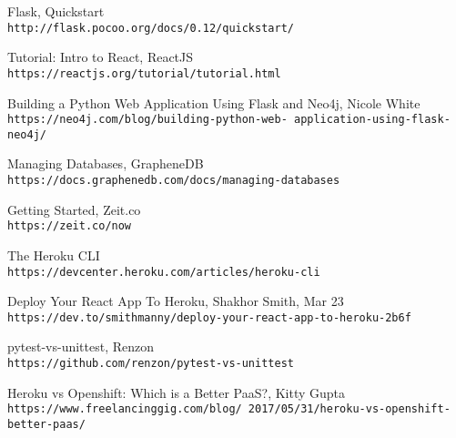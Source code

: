 \begin{thebibliography}{999}
Flask, Quickstart
\\\texttt{http://flask.pocoo.org/docs/0.12/quickstart/}

Tutorial: Intro to React, ReactJS
\\\texttt{https://reactjs.org/tutorial/tutorial.html}

Building a Python Web Application Using Flask and Neo4j, Nicole White
\\\texttt{https://neo4j.com/blog/building-python-web-
application-using-flask-neo4j/}

Managing Databases, GrapheneDB
\\\texttt{https://docs.graphenedb.com/docs/managing-databases}

Getting Started, Zeit.co
\\\texttt{https://zeit.co/now}

The Heroku CLI
\\\texttt{https://devcenter.heroku.com/articles/heroku-cli}

Deploy Your React App To Heroku,  Shakhor Smith, Mar 23
\\\texttt{https://dev.to/smithmanny/deploy-your-react-app-to-heroku-2b6f}


pytest-vs-unittest, Renzon
\\\texttt{https://github.com/renzon/pytest-vs-unittest}


Heroku vs Openshift: Which is a Better PaaS?, Kitty Gupta
\\\texttt{https://www.freelancinggig.com/blog/
2017/05/31/heroku-vs-openshift-better-paas/}


\end{thebibliography}

